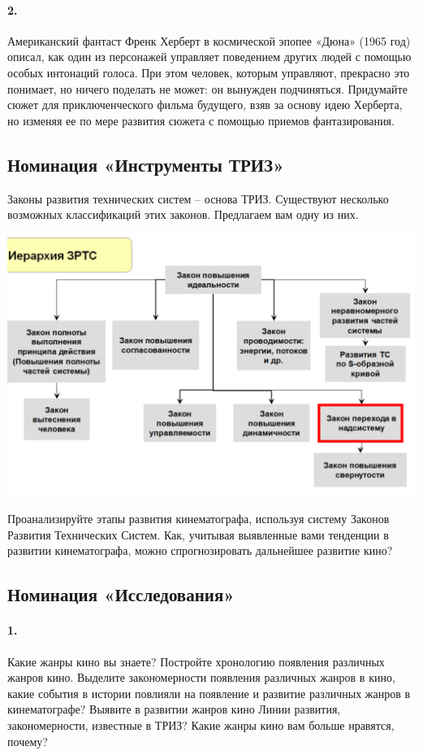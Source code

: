 \documentclass[11pt,a4paper]{article}
\begin{document}
\paragraph{2.}
Американский фантаст Френк Херберт в космической эпопее «Дюна» (1965 год)
описал, как один из персонажей управляет поведением других людей с помощью
особых интонаций голоса. При этом человек, которым управляют, прекрасно это
понимает, но ничего поделать не может: он вынужден подчиняться. Придумайте
сюжет для приключенческого фильма будущего, взяв за основу идею Херберта, но
изменяя ее по мере развития сюжета с помощью приемов фантазирования.

\subsection*{Номинация «Инструменты ТРИЗ»}

Законы развития технических систем – основа ТРИЗ. Существуют несколько
возможных классификаций этих законов. Предлагаем вам одну из них.
\begin{center}
  \includegraphics[width=.9\textwidth]{oE4yUs.png}
\end{center}
Проанализируйте этапы развития кинематографа, используя систему Законов
Развития Технических Систем. Как, учитывая выявленные вами тенденции в
развитии кинематографа, можно спрогнозировать дальнейшее развитие кино?

\subsection*{Номинация «Исследования»}

\paragraph{1.}
Какие жанры кино вы знаете? Постройте хронологию появления различных жанров
кино. Выделите закономерности появления различных жанров в кино, какие события
в истории повлияли на появление и развитие различных жанров в кинематографе?
Выявите в развитии жанров кино Линии развития, закономерности, известные в
ТРИЗ? Какие жанры кино вам больше нравятся, почему?
\end{document}
